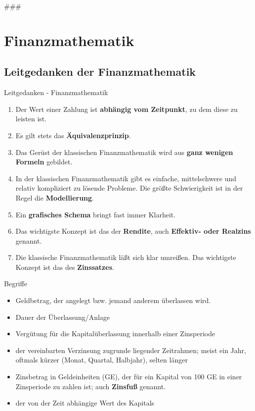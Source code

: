 ###\section{Finanzmathematik}

\subsection{Leitgedanken der Finanzmathematik}
\begin{frame}{Leitgedanken - Finanzmathematik}
	\begin{bemerkung}[Leitgedanken]
	\begin{enumerate}
	\item Der Wert einer Zahlung ist \textbf{abhängig vom Zeitpunkt}, zu dem diese zu leisten ist.
	\item Es gilt stets das \textbf{Äquivalenzprinzip}.
	\item Das Gerüst der klassischen Finanzmathematik wird aus \textbf{ganz wenigen Formeln} gebildet.
	\item In der klassischen Finanzmathematik gibt es einfache, mittelschwere und relativ kompliziert zu lösende Probleme. Die größte Schwierigkeit ist in der Regel die \textbf{Modellierung}.
	\item Ein \textbf{grafisches Schema} bringt fast immer Klarheit.
	\item Das wichtigste Konzept ist das der \textbf{Rendite}, auch \textbf{Effektiv- oder Realzins} genannt.
	\item Die klassische Finanzmathematik läßt sich klar umreißen. Das wichtigste Konzept ist das des \textbf{Zinssatzes}.
	\end{enumerate}
	\end{bemerkung}
\end{frame}

\begin{frame}{Begriffe}
	\begin{itemize}
		\item[\textbf{Kapital}] Geldbetrag, der angelegt bzw. jemand anderem überlassen wird.
		\item[\textbf{Laufzeit}] Dauer der Überlassung/Anlage
		\item[\textbf{Zinsen}] Vergütung für die Kapitalüberlassung innerhalb einer Zinsperiode
		\item[\textbf{Zinsperiode}] der vereinbarten Verzinsung zugrunde liegender Zeitrahmen; meist ein Jahr, oftmals kürzer (Monat, Quartal, Halbjahr), selten länger
		\item[\textbf{Zinssatz}] Zinsbetrag in Geldeinheiten (GE), der für ein Kapital von 100 GE in einer Zinsperiode zu zahlen ist; auch \textbf{Zinsfuß} genannt.
		\item[\textbf{Zeitwert}] der von der Zeit abhängige Wert des Kapitals
	\end{itemize}
\end{frame}

